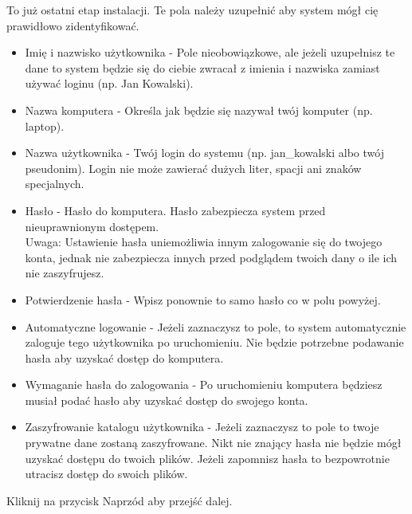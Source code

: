 To już ostatni etap instalacji. Te pola należy uzupełnić aby system mógł cię prawidłowo zidentyfikować.
\begin{itemize}
\item \textcolor{ubuntu_orange}{Imię i nazwisko użytkownika} - Pole nieobowiązkowe, ale jeżeli uzupełnisz te dane to system będzie się do ciebie zwracał z imienia i nazwiska zamiast używać loginu (np. Jan Kowalski).
\item \textcolor{ubuntu_orange}{Nazwa komputera} - Określa jak będzie się nazywał twój komputer (np. laptop).
\item \textcolor{ubuntu_orange}{Nazwa użytkownika} - Twój login do systemu (np. jan\_kowalski albo twój pseudonim). Login nie może zawierać dużych liter, spacji ani znaków specjalnych.
\item \textcolor{ubuntu_orange}{Hasło} - Hasło do komputera. Hasło zabezpiecza system przed nieuprawnionym dostępem.\\
Uwaga: Ustawienie hasła uniemożliwia innym zalogowanie się do twojego konta, jednak nie zabezpiecza innych przed podglądem twoich dany o ile ich nie zaszyfrujesz. 
\item \textcolor{ubuntu_orange}{Potwierdzenie hasła} - Wpisz ponownie to samo hasło co w polu powyżej.
\item \textcolor{ubuntu_orange}{Automatyczne logowanie} - Jeżeli zaznaczysz to pole, to system automatycznie zaloguje tego użytkownika po uruchomieniu. Nie będzie potrzebne podawanie hasła aby uzyskać dostęp do komputera.
\item \textcolor{ubuntu_orange}{Wymaganie hasła do zalogowania} - Po uruchomieniu komputera będziesz musiał podać hasło aby uzyskać dostęp do swojego konta.
\item \textcolor{ubuntu_orange}{Zaszyfrowanie katalogu użytkownika} - Jeżeli zaznaczysz to pole to twoje prywatne dane zostaną zaszyfrowane. Nikt nie znający hasła nie będzie mógł uzyskać dostępu do twoich plików. Jeżeli zapomnisz hasła to bezpowrotnie utracisz dostęp do swoich plików.
\end{itemize}
\begin{flushright}
Kliknij na przycisk \textcolor{ubuntu_orange}{Naprzód} aby przejść dalej.
\end{flushright}
\clearpage
